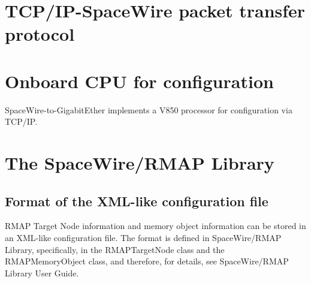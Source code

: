 \documentclass[a4paper,10pt]{article}
\begin{document}
\appendix
\chapter{TCP/IP-SpaceWire packet transfer protocol}
\chapter{Onboard CPU for configuration}
SpaceWire-to-GigabitEther implements a V850 processor for configuration via TCP/IP. 
\chapter{The SpaceWire/RMAP Library}

\appendix
\section{Format of the XML-like configuration file}
RMAP Target Node information and memory object information can be stored in an XML-like configuration file.
The format is defined in SpaceWire/RMAP Library, specifically, in the RMAPTargetNode class and the RMAPMemoryObject class, and therefore, for details, see SpaceWire/RMAP Library User Guide.
\end{document}

